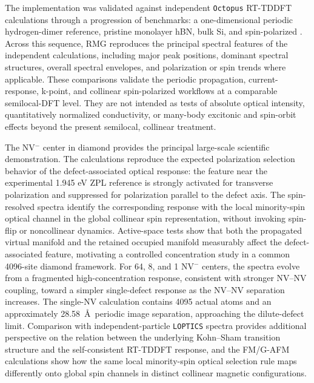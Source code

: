 \documentclass[journal=jctcce,manuscript=article,etalmode=truncate,maxauthors=10,layout=onecolumn]{achemso}
\begin{document}
The implementation was validated against independent \texttt{Octopus}
RT-TDDFT calculations through a progression of benchmarks:
a one-dimensional periodic hydrogen-dimer reference, pristine monolayer
hBN, bulk Si, and spin-polarized .  Across this sequence, RMG
reproduces the principal spectral features of the independent
calculations, including major peak positions, dominant spectral
structures, overall spectral envelopes, and polarization or spin trends
where applicable.  These comparisons validate the periodic propagation,
current-response, k-point, and collinear spin-polarized workflows at a
comparable semilocal-DFT level.  They are not intended as tests of
absolute optical intensity, quantitatively normalized conductivity, or
many-body excitonic and spin-orbit effects beyond the present
semilocal, collinear treatment.

The NV$^{-}$ center in diamond provides the principal large-scale
scientific demonstration.  The calculations reproduce the expected
polarization selection behavior of the defect-associated optical
response: the feature near the experimental 1.945 eV ZPL reference is
strongly activated for transverse polarization and suppressed for
polarization parallel to the defect axis.  The spin-resolved spectra
identify the corresponding response with the local minority-spin
optical channel in the global collinear spin representation, without
invoking spin-flip or noncollinear dynamics.  Active-space tests show
that both the propagated virtual manifold and the retained occupied
manifold measurably affect the defect-associated feature, motivating a
controlled concentration study in a common 4096-site diamond framework.
For 64, 8, and 1 NV$^{-}$ centers, the spectra evolve from a fragmented
high-concentration response, consistent with stronger NV--NV coupling,
toward a simpler single-defect response as the NV--NV separation
increases.  The single-NV calculation contains 4095 actual atoms and an
approximately 28.58~\AA\ periodic image separation, approaching the
dilute-defect limit.  Comparison with independent-particle
\texttt{LOPTICS} spectra provides additional perspective on the
relation between the underlying Kohn--Sham transition structure and the
self-consistent RT-TDDFT response, and the FM/G-AFM calculations show
how the same local minority-spin optical selection rule maps
differently onto global spin channels in distinct collinear magnetic
configurations.
\end{document}
